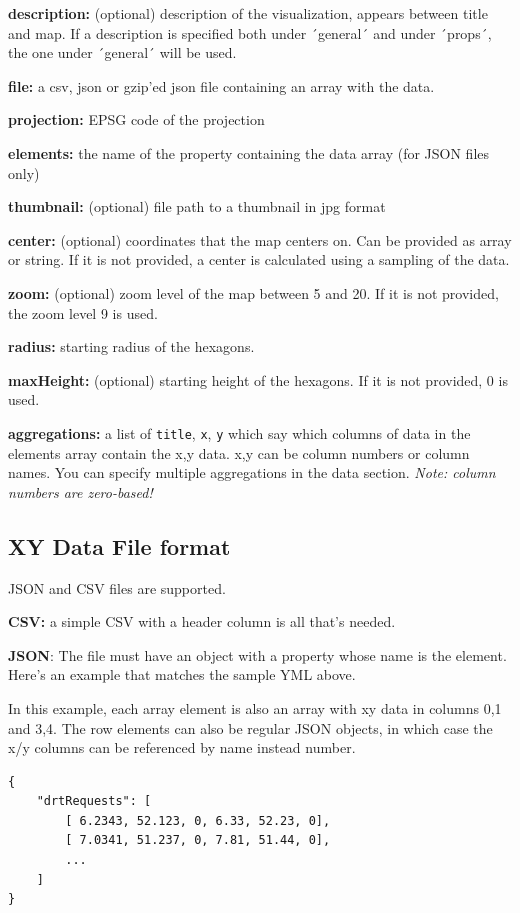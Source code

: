\textbf{description:} (optional) description of the visualization,
appears between title and map. If a description is specified both under
´general´ and under ´props´, the one under ´general´ will be used.

\textbf{file:} a csv, json or gzip'ed json file containing an array with
the data.

\textbf{projection:} EPSG code of the projection

\textbf{elements:} the name of the property containing the data array
(for JSON files only)

\textbf{thumbnail:} (optional) file path to a thumbnail in jpg format

\textbf{center:} (optional) coordinates that the map centers on. Can be
provided as array or string. If it is not provided, a center is
calculated using a sampling of the data.

\textbf{zoom:} (optional) zoom level of the map between 5 and 20. If it
is not provided, the zoom level 9 is used.

\textbf{radius:} starting radius of the hexagons.

\textbf{maxHeight:} (optional) starting height of the hexagons. If it is
not provided, 0 is used.

\textbf{aggregations:} a list of \texttt{title}, \texttt{x}, \texttt{y}
which say which columns of data in the elements array contain the x,y
data. x,y can be column numbers or column names. You can specify
multiple aggregations in the data section. \emph{Note: column numbers
are zero-based!}

\hypertarget{xy-data-file-format}{%
\subsection{XY Data File format}\label{xy-data-file-format}}

JSON and CSV files are supported.

\textbf{CSV:} a simple CSV with a header column is all that's needed.

\textbf{JSON}: The file must have an object with a property whose name
is the element. Here's an example that matches the sample YML above.

In this example, each array element is also an array with xy data in
columns 0,1 and 3,4. The row elements can also be regular JSON objects,
in which case the x/y columns can be referenced by name instead number.

\begin{lstlisting}
{
    "drtRequests": [
        [ 6.2343, 52.123, 0, 6.33, 52.23, 0],
        [ 7.0341, 51.237, 0, 7.81, 51.44, 0],
        ...
    ]
}
\end{lstlisting}


